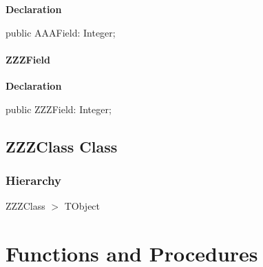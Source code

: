 \documentclass{report}
\begin{document}
\begin{list}{}{
\setlength{\itemindent}{0cm}
\setlength{\listparindent}{0cm}
\setlength{\leftmargin}{\evensidemargin}
\addtolength{\leftmargin}{\tmplength}
\settowidth{\labelsep}{X}
\addtolength{\leftmargin}{\labelsep}
\setlength{\labelwidth}{\tmplength}
}
\begin{flushleft}
\item[\textbf{Declaration}\hfill]
\begin{ttfamily}
public AAAField: Integer;\end{ttfamily}


\end{flushleft}
\end{list}
\paragraph*{ZZZField}\hspace*{\fill}

\begin{list}{}{
\setlength{\itemindent}{0cm}
\setlength{\listparindent}{0cm}
\setlength{\leftmargin}{\evensidemargin}
\addtolength{\leftmargin}{\tmplength}
\settowidth{\labelsep}{X}
\addtolength{\leftmargin}{\labelsep}
\setlength{\labelwidth}{\tmplength}
}
\begin{flushleft}
\item[\textbf{Declaration}\hfill]
\begin{ttfamily}
public ZZZField: Integer;\end{ttfamily}


\end{flushleft}
\end{list}
\subsection*{ZZZClass Class}
\subsubsection*{\large{\textbf{Hierarchy}}\normalsize\hspace{1ex}\hfill}
ZZZClass {$>$} TObject
\section{Functions and Procedures}
\end{document}
